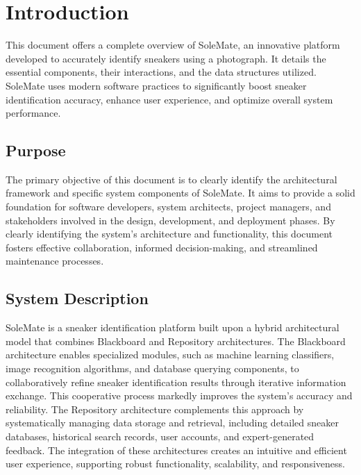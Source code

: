 \documentclass[]{article}
\begin{document}
\newpage
\section{Introduction}
\label{sec:introduction}

This document offers a complete overview of SoleMate, an innovative platform developed to accurately identify sneakers using a photograph. It details the essential components, their interactions, and the data structures utilized. SoleMate uses modern software practices to significantly boost sneaker identification accuracy, enhance user experience, and optimize overall system performance.

\subsection{Purpose}
\label{sub:purpose}
The primary objective of this document is to clearly identify the architectural framework and specific system components of SoleMate. It aims to provide a solid foundation for software developers, system architects, project managers, and stakeholders involved in the design, development, and deployment phases. By clearly identifying the system's architecture and functionality, this document fosters effective collaboration, informed decision-making, and streamlined maintenance processes.

\subsection{System Description}
\label{sub:system_description}
SoleMate is a sneaker identification platform built upon a hybrid architectural model that combines Blackboard and Repository architectures. The Blackboard architecture enables specialized modules, such as machine learning classifiers, image recognition algorithms, and database querying components, to collaboratively refine sneaker identification results through iterative information exchange. This cooperative process markedly improves the system’s accuracy and reliability. The Repository architecture complements this approach by systematically managing data storage and retrieval, including detailed sneaker databases, historical search records, user accounts, and expert-generated feedback. The integration of these architectures creates an intuitive and efficient user experience, supporting robust functionality, scalability, and responsiveness.
\end{document}
